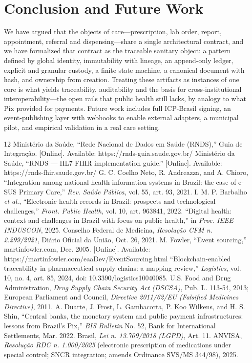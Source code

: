 \documentclass[conference]{IEEEtran}
\begin{document}
\section{Conclusion and Future Work}\label{sec:concl}
We have argued that the objects of care---prescription, lab order, report, appointment, referral and dispensing---share a single architectural contract, and we have formalized that contract as the traceable sanitary object: a pattern defined by global identity, immutability with lineage, an append-only ledger, explicit and granular custody, a finite state machine, a canonical document with hash, and ownership from creation. Treating these artifacts as instances of one core is what yields traceability, auditability and the basis for cross-institutional interoperability---the open rails that public health still lacks, by analogy to what Pix provided for payments. Future work includes full ICP-Brasil signing, an event-publishing layer with webhooks to enable external adapters, a municipal pilot, and empirical validation in a real care setting.

\begin{thebibliography}{12}
 Minist\'erio da Sa\'ude, ``Rede Nacional de Dados em Sa\'ude (RNDS),'' Guia de Integra\c{c}\~ao. [Online]. Available: https://rnds-guia.saude.gov.br/
 Minist\'erio da Sa\'ude, ``RNDS --- HL7 FHIR implementation guide.'' [Online]. Available: https://rnds-fhir.saude.gov.br/
 G. C. Coelho Neto, R. Andreazza, and A. Chioro, ``Integration among national health information systems in Brazil: the case of e-SUS Primary Care,'' \emph{Rev. Sa\'ude P\'ublica}, vol. 55, art. 93, 2021.
 I. M. P. Barbalho \emph{et al.}, ``Electronic health records in Brazil: prospects and technological challenges,'' \emph{Front. Public Health}, vol. 10, art. 963841, 2022.
 ``Digital health: context and challenges in Brazil with focus on public health,'' in \emph{Proc. IEEE INDUSCON}, 2025. %
 Conselho Federal de Medicina, \emph{Resolu\c{c}\~ao CFM n. 2.299/2021}, Di\'ario Oficial da Uni\~ao, Oct. 26, 2021.
 M. Fowler, ``Event sourcing,'' martinfowler.com, Dec. 2005. [Online]. Available: https://martinfowler.com/eaaDev/EventSourcing.html
 ``Blockchain-enabled traceability in pharmaceutical supply chains: a mapping review,'' \emph{Logistics}, vol. 10, no. 4, art. 85, 2024, doi: 10.3390/logistics10040085. %
 U.S. Food and Drug Administration, \emph{Drug Supply Chain Security Act (DSCSA)}, Pub. L. 113-54, 2013; European Parliament and Council, \emph{Directive 2011/62/EU (Falsified Medicines Directive)}, 2011.
 A. Duarte, J. Frost, L. Gambacorta, P. Koo Wilkens, and H. S. Shin, ``Central banks, the monetary system and public payment infrastructures: lessons from Brazil's Pix,'' \emph{BIS Bulletin} No. 52, Bank for International Settlements, Mar. 2022.
 Brasil, \emph{Lei n. 13.709/2018 (LGPD)}, Art. 11.
 ANVISA, \emph{Resolu\c{c}\~ao RDC n. 1.000/2025} (electronic prescription of medications under special control; SNCR integration; amends Ordinance SVS/MS 344/98), 2025.
\end{thebibliography}
\end{document}
